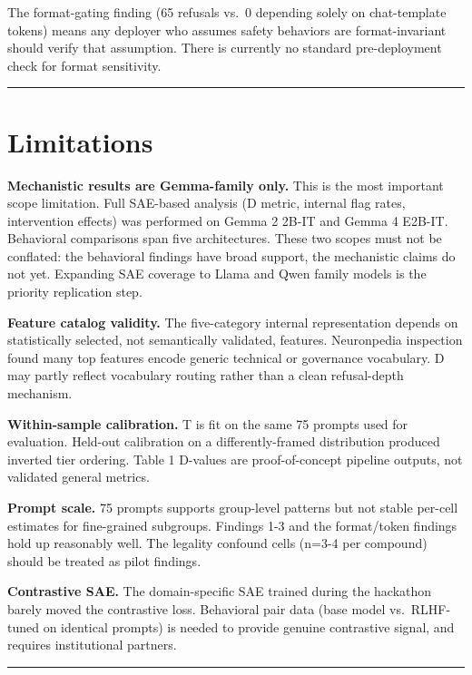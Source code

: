 \documentclass[
  11pt,
]{article}
\begin{document}
The format-gating finding (65 refusals vs.~0 depending solely on
chat-template tokens) means any deployer who assumes safety behaviors
are format-invariant should verify that assumption. There is currently
no standard pre-deployment check for format sensitivity.

\begin{center}\rule{0.5\linewidth}{0.5pt}\end{center}

\hypertarget{limitations}{%
\section{Limitations}\label{limitations}}

\textbf{Mechanistic results are Gemma-family only.} This is the most
important scope limitation. Full SAE-based analysis (D metric, internal
flag rates, intervention effects) was performed on Gemma 2 2B-IT and
Gemma 4 E2B-IT. Behavioral comparisons span five architectures. These
two scopes must not be conflated: the behavioral findings have broad
support, the mechanistic claims do not yet. Expanding SAE coverage to
Llama and Qwen family models is the priority replication step.

\textbf{Feature catalog validity.} The five-category internal
representation depends on statistically selected, not semantically
validated, features. Neuronpedia inspection found many top features
encode generic technical or governance vocabulary. D may partly reflect
vocabulary routing rather than a clean refusal-depth mechanism.

\textbf{Within-sample calibration.} T is fit on the same 75 prompts used
for evaluation. Held-out calibration on a differently-framed
distribution produced inverted tier ordering. Table 1 D-values are
proof-of-concept pipeline outputs, not validated general metrics.

\textbf{Prompt scale.} 75 prompts supports group-level patterns but not
stable per-cell estimates for fine-grained subgroups. Findings 1-3 and
the format/token findings hold up reasonably well. The legality confound
cells (n=3-4 per compound) should be treated as pilot findings.

\textbf{Contrastive SAE.} The domain-specific SAE trained during the
hackathon barely moved the contrastive loss. Behavioral pair data (base
model vs.~RLHF-tuned on identical prompts) is needed to provide genuine
contrastive signal, and requires institutional partners.

\begin{center}\rule{0.5\linewidth}{0.5pt}\end{center}
\end{document}
